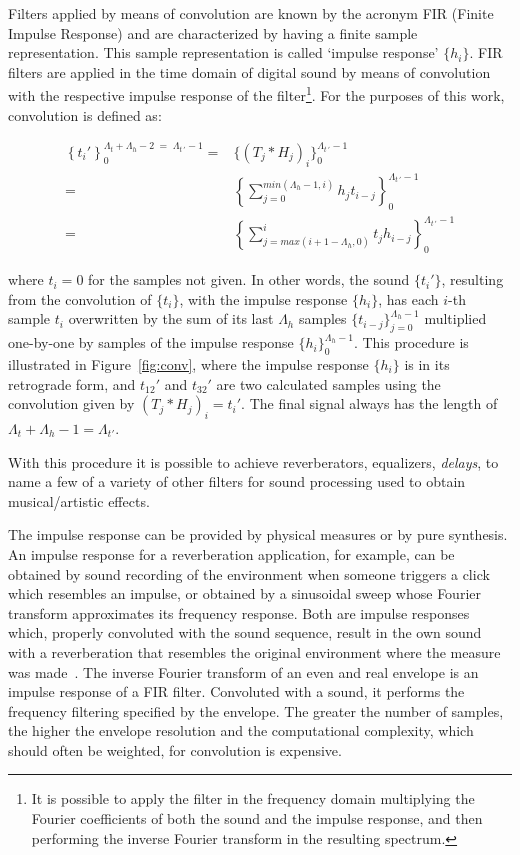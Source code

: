 Filters applied by means of convolution are known by the acronym FIR (Finite Impulse Response) and are characterized by having a finite sample representation. This sample representation is called `impulse response' $\{h_i\}$. FIR filters are applied in the time domain of digital sound by means of convolution with the respective impulse response of the filter\footnote{It is possible to apply the filter in the frequency domain multiplying the Fourier coefficients of both the sound and the impulse response, and then performing the inverse Fourier transform in the resulting spectrum.\cite{Openheim}}. For the purposes of this work, convolution is defined as:

\begin{equation}\label{eq:conv}
 \begin{split}
 \left\{t_i'\right\}_0^{\Lambda_t+\Lambda_h-2\; = \;\Lambda_{t\, '}-1} = & \{(T_j*H_j)_i\}_0^{\Lambda_{t \, '}-1} \\ = & \left \{ \sum_{j=0}^{min(\Lambda_h-1,i)}h_{j} t_{i-j} \right \}_0^{\Lambda_{t\, '}-1} 
     \\ = & \left \{ \sum_{j=max(i+1-\Lambda_h,0)}^{i}t_j h_{i-j} \right \}_0^{\Lambda_{t\, '}-1}
 \end{split}
\end{equation}

\noindent where $t_i=0$ for the samples not given.
In other words, the sound $\{t_i'\}$, resulting from the convolution of $\{t_i\}$, with the impulse response $\{h_i\}$, has each $i$-th sample $t_i$ overwritten by the sum of its last $\Lambda_h$ samples $\{t_{i-j}\}_{j=0}^{\Lambda_h-1}$ multiplied one-by-one by samples of the impulse response $\{h_i\}_0^{\Lambda_h-1}$. This procedure is illustrated in Figure~\ref{fig:conv}, where the impulse response $\{h_i\}$ is in its retrograde form, and $t_{12}'$ and $t_{32}'$ are two calculated samples using the convolution given by $(T_j*H_j)_i=t_i'$. The final signal always has the length of $\Lambda_t+\Lambda_h -1=\Lambda_{t'}$.

With this procedure it is possible to achieve reverberators, equalizers, \emph{delays}, to name a few of a variety of other filters for sound processing used to obtain musical/artistic effects.

The impulse response can be provided by physical measures or by pure synthesis. An impulse response for a reverberation application, for example, can be obtained by sound recording of the environment when someone triggers a click which resembles an impulse, or obtained by a sinusoidal sweep whose Fourier transform approximates its frequency response. Both are impulse responses which, properly convoluted with the sound sequence, result in the own sound with a reverberation that resembles the original environment where the measure was made~\cite{Cook}. The inverse Fourier transform of an even and real envelope is an impulse response of a FIR filter. Convoluted with a sound, it performs the frequency filtering specified by the envelope. The greater the number of samples, the higher the envelope resolution and the computational complexity, which should often be weighted, for convolution is expensive.

